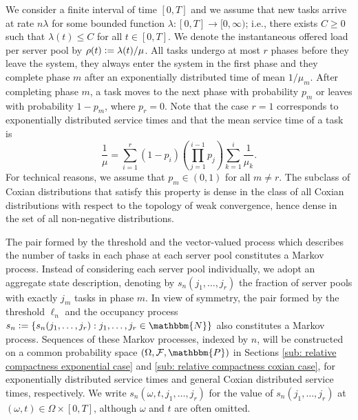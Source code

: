 \documentclass[a4paper, 12pt]{article}
\theoremstyle{definition}
\newcommand{\map}[3]{#1 : #2 \longrightarrow #3}
\newcommand{\set}[2]{\left\{#1 : #2\right\}}
\newcommand{\defeq}{\vcentcolon=}
\newcommand{\prob}{\mathbbm{P}}
\newcommand{\calF}{\mathcal{F}}
\newcommand{\N}{\mathbbm{N}}
\begin{document}
We consider a finite interval of time $[0, T]$ and we assume that new tasks arrive at rate $n \lambda$ for some bounded function $\map{\lambda}{[0, T]}{[0, \infty)}$; i.e., there exists $C \geq 0$ such that $\lambda(t) \leq C$ for all $t \in [0, T]$. We denote the instantaneous offered load per server pool by $\rho(t) \defeq \lambda(t) / \mu$. All tasks undergo at most $r$ phases before they leave the system, they always enter the system in the first phase and they complete phase $m$ after an exponentially distributed time of mean $1 / \mu_m$. After completing phase $m$, a task moves to the next phase with probability $p_m$ or leaves with probability $1 - p_m$, where $p_r = 0$. Note that the case $r = 1$ corresponds to exponentially distributed service times and that the mean service time of a task is
\begin{equation*}
	\frac{1}{\mu} = \sum_{i = 1}^r (1 - p_i) \left(\prod_{j = 1}^{i - 1} p_j\right) \sum_{k = 1}^i \frac{1}{\mu_k}.
\end{equation*}
For technical reasons, we assume that $p_m \in (0, 1)$ for all $m \neq r$. The subclass of Coxian distributions that satisfy this property is dense in the class of all Coxian distributions with respect to the topology of weak convergence, hence dense in the set of all non-negative distributions.

The pair formed by the threshold and the vector-valued process which describes the number of tasks in each phase at each server pool constitutes a Markov process. Instead of considering each server pool individually, we adopt an aggregate state description, denoting by $s_n(j_1, \dots, j_r)$ the fraction of server pools with exactly $j_m$ tasks in phase $m$. In view of symmetry, the pair formed by the threshold $\ell_n$ and the occupancy process $s_n \defeq \set{s_n(j_1, \dots, j_r)}{j_1, \dots, j_r \in \N}$ also constitutes a Markov process. Sequences of these Markov processes, indexed by $n$, will be constructed on a common probability space $(\Omega, \calF, \prob)$ in Sections \ref{sub: relative compactness exponential case} and \ref{sub: relative compactness coxian case}, for exponentially distributed service times and general Coxian distributed service times, respectively. We write $s_n(\omega, t, j_1, \dots, j_r)$ for the value of $s_n(j_1, \dots, j_r)$ at $(\omega, t) \in \Omega \times [0, T]$, although $\omega$ and $t$ are often omitted.
\end{document}
